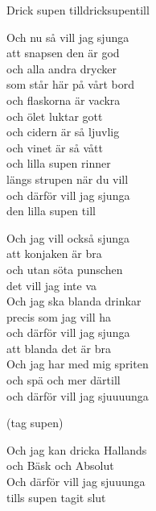 \begin{song}{Drick supen till}{dricksupentill}
\begin{vers}
Och nu så vill jag sjunga\\
att snapsen den är god\\
och alla andra drycker \\
som står här på vårt bord\\
och flaskorna är vackra\\
och ölet luktar gott\\
och cidern är så ljuvlig\\
och vinet är så vått\\
och lilla supen rinner\\
längs strupen när du vill\\
och därför vill jag sjunga\\
den lilla supen till\\
\end{vers}
\begin{vers}
Och jag vill också sjunga\\
att konjaken är bra\\
och utan söta punschen\\
det vill jag inte va\\
Och jag ska blanda drinkar\\
precis som jag vill ha\\
och därför vill jag sjunga\\
att blanda det är bra\\
Och jag har med mig spriten\\
och spä och mer därtill\\
och därför vill jag sjuuuunga\\
\end{vers}
\begin{vers}
(tag supen)\\
\end{vers}
\begin{vers}
Och jag kan dricka Hallands\\
och Bäsk och Absolut\\
Och därför vill jag sjuuunga\\
tills supen tagit slut\\
\end{vers}
\end{song}
